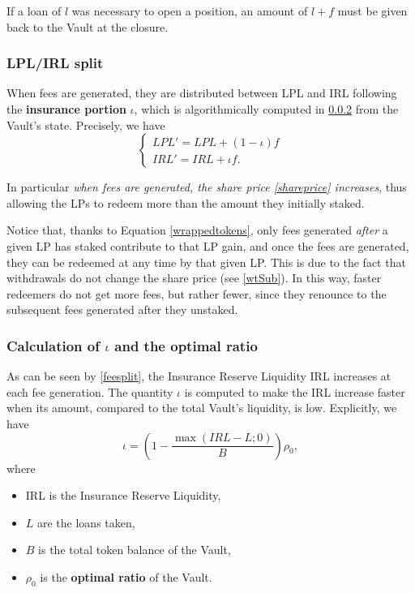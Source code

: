 \documentclass[a4paper,10 pt]{article}
\theoremstyle{definition}
\begin{document}
If a loan of $l$ was necessary to open a position, an amount of $l + f$ must be given back to the Vault at the closure. 

\subsubsection{LPL/IRL split}\label{lisSubSub}

When fees are generated, they are distributed between LPL and IRL following the {\bf insurance portion} $\iota$, which is algorithmically computed in \ref{iotaSubSub} from the Vault's state. Precisely, we have
\begin{equation}\label{feesplit}
\begin{cases}
LPL' = LPL + (1-\iota)f \\
IRL' = IRL + \iota f.
\end{cases}
\end{equation}

In particular {\it when fees are generated, the share price \eqref{shareprice} increases}, thus allowing the LPs to redeem more than the amount they initially staked.

Notice that, thanks to Equation \eqref{wrappedtokens}, only fees generated {\it after} a given LP has staked contribute to that LP gain, and once the fees are generated, they can be redeemed at any time by that given LP. This is due to the fact that withdrawals do not change the share price (see \ref{wtSub}). In this way, faster redeemers do not get more fees, but rather fewer, since they renounce to the subsequent fees generated after they unstaked.

\subsubsection{Calculation of $\iota$ and the optimal ratio}\label{iotaSubSub}

As can be seen by \eqref{feesplit}, the Insurance Reserve Liquidity IRL increases at each fee generation. The quantity $\iota$ is computed to make the IRL increase faster when its amount, compared to the total Vault's liquidity, is low. Explicitly, we have
\begin{equation}\label{iota}
\iota = \left(1-\frac{\max(IRL-L;0)}{B}\right)\rho_0,
\end{equation}
where 
\begin{itemize}
\item IRL is the Insurance Reserve Liquidity,
\item $L$ are the loans taken,
\item $B$ is the total token balance of the Vault,
\item $\rho_0$ is the {\bf optimal ratio} of the Vault.
\end{itemize}
\end{document}
